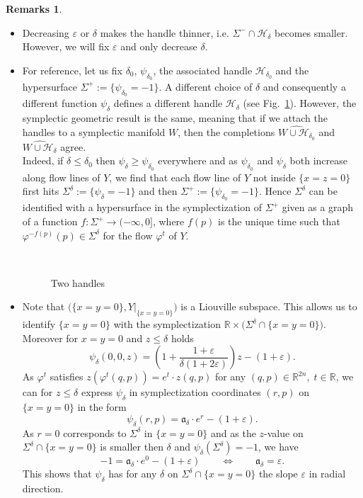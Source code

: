 \documentclass[a4paper,12pt,bibliography=totocnumbered,titlepage=false,abstracton,bookmarksnumbered=true]{scrartcl}
\newcommand{\veps}{\varepsilon}
\theoremstyle{definition}
\newtheorem{remarks}[defn]{Remarks}
\begin{document}
\begin{remarks}\label{remarksonpsi}~
 \begin{itemize}
  \item Decreasing $\veps$ or $\delta$ makes the handle thinner, i.e. $\Sigma^-\cap \mathcal{H}_\delta$ becomes smaller. However, we will fix $\veps$ and only decrease $\delta$.
  \item For reference, let us fix $\delta_0$, $\psi_{\delta_0}$, the associated handle $\mathcal{H}_{\delta_0}$  and the hypersurface $\Sigma^+:=\big\{\psi_{\delta_0}=-1\big\}$. A different choice of $\delta$  and consequently a different function $\psi_\delta$ defines a different handle $\mathcal{H}_\delta$ (see Fig.\ \ref{fig2handles}). However, the symplectic geometric result is the same, meaning that if we attach the handles to a symplectic manifold $W$, then the completions $\widehat{W{\cup} \mathcal{H}_{\delta_0}}$ and $\widehat{W{\cup} \mathcal{H}_\delta}$ agree.\\
  Indeed, if $\delta\leq \delta_0$ then $\psi_\delta\geq\psi_{\delta_0}$ everywhere and as $\psi_{\delta_0}$ and $\psi_\delta$ both increase along flow lines of $Y$, we find that each flow line of $Y$ not inside $\{x{=}z{=}0\}$ first hits $\Sigma^\delta:=\{\psi_\delta=-1\}$ and then $\Sigma^+:=\{\psi_{\delta_0}=-1\}$. Hence $\Sigma^\delta$ can be identified with a hypersurface in the symplectization of $\Sigma^+$ given as a graph of a function $f:\Sigma^+\rightarrow(-\infty,0]$, where $f(p)$ is the unique time such that $\varphi^{-f(p)}(p)\in\Sigma^{\delta}$ for the flow $\varphi^t$ of $Y$.
  \begin{figure}[!htb]
\centering
 \resizebox{10cm}{!}{}
 \\\caption{\label{fig2handles} Two handles}
\end{figure}
  \item Note that $\big(\{x{=}y{=}0\},Y|_{\{x{=}y{=}0\}}\big)$ is a Liouville subspace. This allows us to identify $\{x{=}y{=}0\}$ with the symplectization $\mathbb{R}\times\big(\Sigma^\delta{\cap}\{x{=}y{=}0\}\big)$. Moreover for $x{=}y{=}0$ and $z\leq \delta$ holds
  \[\psi_\delta(0,0,z) = \left(1+\frac{1+\veps}{\delta(1{+}2\veps)}\right) z -(1{+}\veps).\]
  As $\varphi^t$ satisfies $z(\varphi^t(q,p))=e^t{\cdot} z(q,p)$ for any $(q,p)\in\mathbb{R}^{2n}, \;t\in\mathbb{R}$, we can for $z\leq \delta$ express $\psi_\delta$ in symplectization coordinates $(r,p)$ on $\{x{=}y{=}0\}$ in the form
  \[\psi_\delta(r,p)=\mathfrak{a}_\delta{\cdot} e^r-(1{+}\veps).\]
  As $r=0$ corresponds to $\Sigma^\delta$ in $\{x{=}y{=}0\}$ and as the $z$-value on $\Sigma^\delta\cap\{x{=}y{=}0\}$ is smaller then $\delta$ and $\psi_\delta(\Sigma^\delta)=-1$, we have 
  \[-1=\mathfrak{a}_\delta{\cdot} e^0-(1{+}\veps)\qquad\Leftrightarrow\qquad \mathfrak{a}_\delta=\veps.\]
  This shows that $\psi_\delta$ has for any $\delta$ on $\Sigma^\delta\cap\{x{=}y{=}0\}$ the slope $\veps$ in radial direction.
 \end{itemize}
\end{remarks}
\end{document}
